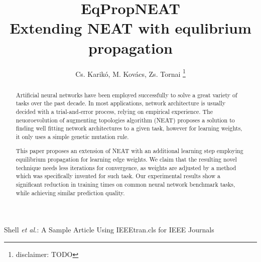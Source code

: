 \documentclass[lettersize,journal]{IEEEtran}
\begin{document}
	
	\title{EqPropNEAT\\Extending NEAT with equlibrium propagation}
	
	\author{Cs. Karikó, M. Kovács, Zs. Tornai
			\thanks{disclaimer: TODO}
		}
		
		{Shell \MakeLowercase{\textit{et al.}}: A Sample Article Using IEEEtran.cls for IEEE Journals}
		
		
		\maketitle
		
		\begin{abstract}
			Artificial neural networks have been employed successfully to solve a great variety of tasks over the past decade. In most applications, network architecture is usually decided with a trial-and-error process, relying on empirical experience.
			The neuoroevolution of augmenting topologies algorithm (NEAT) \cite{neat} proposes a solution to finding well fitting network architectures to a given task, however for learning weights, it only uses a simple genetic mutation rule.
			
			This paper proposes an extension of NEAT with an additional learning step employing equilibrium propagation \cite{eqprop} for learning edge weights. We claim that the resulting novel technique needs less iterations for convergence, as weights are adjusted by a method which was specifically invented for such task. Our experimental results show a significant reduction in training times on common neural network benchmark tasks, while achieving similar prediction quality.
		\end{abstract}
		
		
\end{document}
